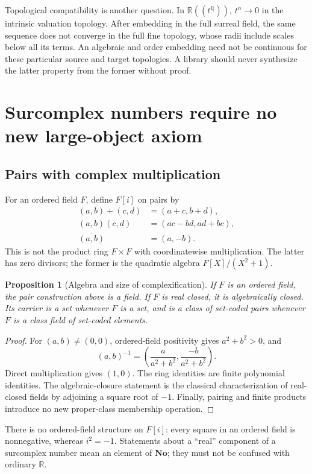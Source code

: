 \documentclass[11pt,letterpaper]{article}
\numberwithin{equation}{section}
\newtheorem{proposition}[theorem]{Proposition}
\theoremstyle{definition}
\theoremstyle{remark}
\newcommand{\No}{\mathbf{No}}
\newcommand{\R}{\mathbb{R}}
\newcommand{\Q}{\mathbb{Q}}
\begin{document}
Topological compatibility is another question. In $\R((t^\Q))$, $t^n\to0$ in the intrinsic valuation topology. After embedding in the full surreal field, the same sequence does not converge in the full fine topology, whose radii include scales below all its terms. An algebraic and order embedding need not be continuous for these particular source and target topologies. A library should never synthesize the latter property from the former without proof.

\section{Surcomplex numbers require no new large-object axiom}\label{sec:surcomplex}
\subsection{Pairs with complex multiplication}
For an ordered field $F$, define $F[i]$ on pairs by
\begin{align}
 (a,b)+(c,d)&=(a+c,b+d),\\
 (a,b)(c,d)&=(ac-bd,ad+bc),\\
 \overline{(a,b)}&=(a,-b).
\end{align}
This is not the product ring $F\times F$ with coordinatewise multiplication. The latter has zero divisors; the former is the quadratic algebra $F[X]/(X^2+1)$.

\begin{proposition}[Algebra and size of complexification]\label{prop:complexification}
If $F$ is an ordered field, the pair construction above is a field. If $F$ is real closed, it is algebraically closed. Its carrier is a set whenever $F$ is a set, and is a class of set-coded pairs whenever $F$ is a class field of set-coded elements.
\end{proposition}
\begin{proof}
For $(a,b)\ne(0,0)$, ordered-field positivity gives $a^2+b^2>0$, and
\[
 (a,b)^{-1}=\left(\frac{a}{a^2+b^2},\frac{-b}{a^2+b^2}\right).
\]
Direct multiplication gives $(1,0)$. The ring identities are finite polynomial identities. The algebraic-closure statement is the classical characterization of real-closed fields by adjoining a square root of $-1$. Finally, pairing and finite products introduce no new proper-class membership operation.
\end{proof}

There is no ordered-field structure on $F[i]$: every square in an ordered field is nonnegative, whereas $i^2=-1$. Statements about a ``real'' component of a surcomplex number mean an element of $\No$; they must not be confused with ordinary $\R$.
\end{document}
